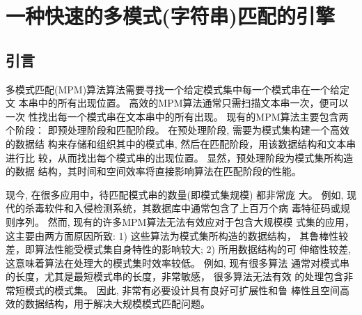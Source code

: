 





\chapter{一种快速的多模式(字符串)匹配的引擎}
\label{chap:MPM}

\section{引言}
\label{sec:2_introduction}


多模式匹配(MPM)算法算法需要寻找一个给定模式集中每一个模式串在一个给定文
本串中的所有出现位置。 高效的MPM算法通常只需扫描文本串一次，便可以一次
性找出每一个模式串在文本串中的所有出现。 现有的MPM算法主要包含两个阶段：
即预处理阶段和匹配阶段。 在预处理阶段, 需要为模式集构建一个高效的数据结
构来存储和组织其中的模式串, 然后在匹配阶段，用该数据结构和文本串进行比
较，从而找出每个模式串的出现位置。 显然，预处理阶段为模式集所构造的数据
结构，其时间和空间效率将直接影响算法在匹配阶段的性能。

现今, 在很多应用中，待匹配模式串的数量(即模式集规模) 都非常庞
大。 例如, 现代的杀毒软件和入侵检测系统，其数据库中通常包含了上百万个病
毒特征码或规则序列。 然而, 现有的许多MPM算法无法有效应对于包含大规模模
式集的应用，这主要由两方面原因所致: 1) 这些算法为模式集所构造的数据结构，
其鲁棒性较差，即算法性能受模式集自身特性的影响较大; 2) 所用数据结构的可
伸缩性较差, 这意味着算法在处理大的模式集时效率较低。 例如, 现有很多算法
通常对模式串的长度，尤其是最短模式串的长度，非常敏感， 很多算法无法有效
的处理包含非常短模式的模式集。 因此, 非常有必要设计具有良好可扩展性和鲁
棒性且空间高效的数据结构，用于解决大规模模式匹配问题。


